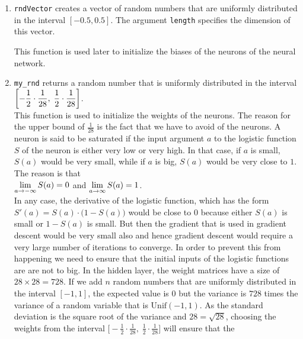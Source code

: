 \begin{enumerate}
\item \texttt{rndVector} creates a vector of random numbers that are uniformly distributed in the
      interval $[-0.5, 0.5]$.  The argument \texttt{length} specifies the dimension of this vector.

      This function is used later to initialize the biases of the neurons of the neural network.
\item \texttt{my\_rnd} returns a random number that is uniformly distributed in the interval
      \\[0.2cm]
      \hspace*{1.3cm}
      $\displaystyle \biggl[-\frac{1}{2}\cdot\frac{1}{28},\; \frac{1}{2}\cdot\frac{1}{28}\biggr]$. 
      \\[0.2cm]
      This function is used to initialize the weights of the neurons.  The reason for the upper bound of
      $\frac{1}{28}$ is the fact that we have to avoid  of the neurons.  A neuron is said to
      be saturated if the input argument $a$ to the logistic function $S$ of the neuron is either very low or very
      high.  In that case, if $a$ is small, $S(a)$ would be very small, while if $a$ is big, $S(a)$ would be
      very close to $1$.  The reason is that
      \\[0.2cm]
      \hspace*{1.3cm}
      $\displaystyle\lim\limits_{a\rightarrow-\infty} S(a) = 0$ \quad and \quad       $\displaystyle\lim\limits_{a\rightarrow\infty} S(a) = 1$.
      \\[0.2cm]
      In any case, the derivative of the logistic function, which has the form
      $S'(a)=S(a)\cdot\bigl(1-S(a)\bigr)$ would be close to $0$ because either $S(a)$ is small or $1-S(a)$ is
      small.  But then the gradient that is used in gradient descent would be very small also and hence
      gradient descent would require a very large number of iterations to converge.  In order to prevent this
      from happening we need to ensure that the initial inputs of the logistic functions are are not to big.
      In the hidden layer, the weight matrices have a size of $28 \times 28 = 728$. If we add $n$ random
      numbers that are uniformly distributed in the interval $[-1,1]$, the expected value is $0$ but the
      variance is $728$ times the variance of a random variable that is $\mathrm{Unif}(-1,1)$.  As the standard
      deviation is the square root of the variance and $28 = \sqrt{28}$, choosing the weights from the interval
      $\bigl[-\frac{1}{2}\cdot\frac{1}{28},\; \frac{1}{2}\cdot\frac{1}{28}\bigr]$ will ensure that the

\end{enumerate}
